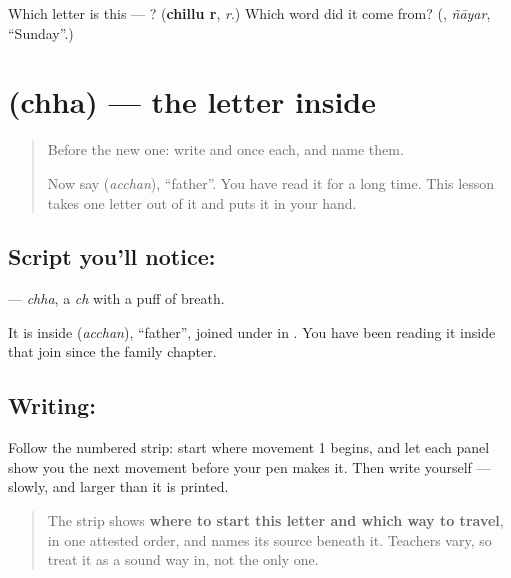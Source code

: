 \begin{tcolorbox}[breakable,colback=teal!4,colframe=teal!35!black,title={Before you move on}]
Which letter is this — ? (\textbf{chillu r}, \emph{r}.) Which word did it come from? (\textbf{}, \emph{ñāyar}, \textquotedblleft{}Sunday\textquotedblright{}.)
\end{tcolorbox}
\section[\texorpdfstring{\ml{ഛ} (chha)}{ഛ (chha)}]{ (chha) — the letter inside }

\label{lesson:ML-W114-chha}



\begin{quote}
Before the new one: write  and  once each, and name them.

Now say \textbf{} (\emph{acchan}), \textquotedblleft{}father\textquotedblright{}. You have read it for a long time. This lesson takes one letter out of it and puts it in your hand.
\end{quote}

\subsection*{Script you'll notice: }
\textbf{} — \emph{chha}, a \emph{ch} with a puff of breath.

It is inside \textbf{} (\emph{acchan}), \textquotedblleft{}father\textquotedblright{}, joined under \textbf{} in \textbf{}. You have been reading it inside that join since the family chapter.

\subsection*{Writing: }

Follow the numbered strip: start where movement 1 begins, and let each panel show you the next movement before your pen makes it. Then write  yourself — slowly, and larger than it is printed.

\begin{quote}
The strip shows \textbf{where to start this letter and which way to travel}, in one attested order, and names its source beneath it. Teachers vary, so treat it as a sound way in, not the only one.
\end{quote}

